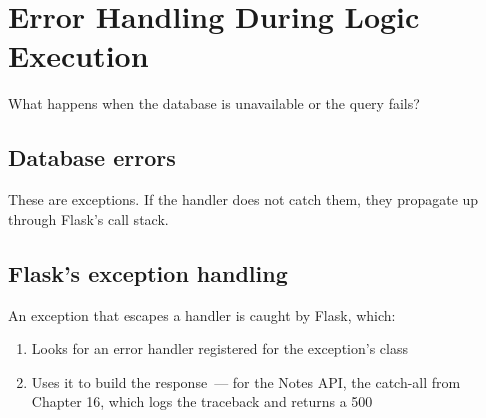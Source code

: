 \setcounter{section}{14}
\section{Error Handling During Logic Execution}\label{33-logic-execution:3315-error-handling-during-logic-execution}

What happens when the database is unavailable or the query fails?

\subsection*{Database errors}\label{33-logic-execution:database-errors}

\begin{codebox}[short]

\begin{Shaded}
\begin{Highlighting}[]
\OperatorTok{=}

\OperatorTok{=}
\end{Highlighting}
\end{Shaded}

\end{codebox}

\noindent{}These are exceptions. If the handler does not catch them, they propagate up through Flask's call stack.

\subsection*{Flask's exception handling}\label{33-logic-execution:flasks-exception-handling}

An exception that escapes a handler is caught by Flask, which:

\begin{enumerate}
\def\labelenumi{\arabic{enumi}.}
\tightlist
\item
  Looks for an error handler registered for the exception's class
\item
  Uses it to build the response~--- for the Notes API, the catch-all from Chapter 16, which logs the traceback and returns a 500
\end{enumerate}

